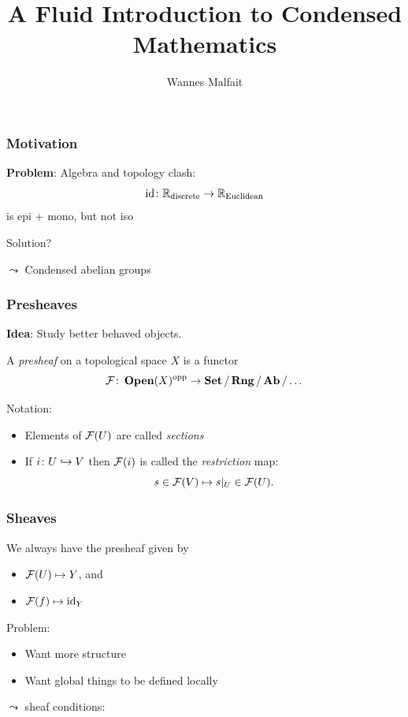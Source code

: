 \documentclass{beamer}
\title{A Fluid Introduction to Condensed Mathematics}
\author{Wannes Malfait}
\date{}
\DeclareMathOperator{\Open}{\mathbf{Open}}
\DeclareMathOperator{\opp}{opp}
\DeclareMathOperator{\id}{id}
\begin{document}
\maketitle

\begin{frame}
    \frametitle{Motivation}

    \textbf{Problem}: Algebra and topology clash:
    \begin{equation*}
        \id \colon \bbR_{\text{discrete}} \to \bbR_{\text{Euclidean}}
    \end{equation*}
    is epi + mono, but not iso

    \medskip
    Solution?
    \pause

    $\leadsto$ Condensed abelian groups
\end{frame}

\begin{frame}
    \frametitle{Presheaves}

    \textbf{Idea}: Study better behaved objects.
    \pause

    \begin{definition}
        A \emph{presheaf} on a topological space $X$
        is a functor
        \begin{equation*}
            \mcF \colon \Open(X)^{\opp} \to \Set / \Rng / \Ab / \dots
        \end{equation*}
    \end{definition}
    Notation:
    \begin{itemize}
        \item Elements of $\mathcal{F}(U)$ are called \emph{sections}
        \item If $ i \colon U\hookrightarrow V$ then $\mathcal{F}(i)$ is
              called the \emph{restriction} map:
              \begin{equation*}
                  s\in \mathcal{F}(V) \mapsto s|_U \in \mathcal{F}(U).
              \end{equation*}
    \end{itemize}

\end{frame}

\begin{frame}
    \frametitle{Sheaves}

    \begin{example}
        We always have the presheaf given by
        \begin{itemize}
            \item $\mathcal{F}(U) \mapsto Y$, and
            \item $\mcF(f) \mapsto \id_Y$
        \end{itemize}
    \end{example}
    \pause
    Problem:
    \begin{itemize}
        \item Want more structure
        \item Want global things to be defined locally
    \end{itemize}
    $\leadsto$ sheaf conditions:

\end{frame}
\end{document}

